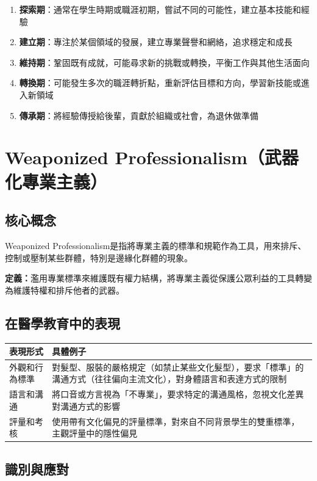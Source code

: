 \documentclass[12pt,a4paper]{article}
\begin{document}
\begin{enumerate}
    \item \textbf{探索期}：通常在學生時期或職涯初期，嘗試不同的可能性，建立基本技能和經驗
    \item \textbf{建立期}：專注於某個領域的發展，建立專業聲譽和網絡，追求穩定和成長
    \item \textbf{維持期}：鞏固既有成就，可能尋求新的挑戰或轉換，平衡工作與其他生活面向
    \item \textbf{轉換期}：可能發生多次的職涯轉折點，重新評估目標和方向，學習新技能或進入新領域
    \item \textbf{傳承期}：將經驗傳授給後輩，貢獻於組織或社會，為退休做準備
\end{enumerate}

\section{Weaponized Professionalism（武器化專業主義）}

\subsection{核心概念}

Weaponized Professionalism是指將專業主義的標準和規範作為工具，用來排斥、控制或壓制某些群體，特別是邊緣化群體的現象。

\textbf{定義：}濫用專業標準來維護既有權力結構，將專業主義從保護公眾利益的工具轉變為維護特權和排斥他者的武器。

\subsection{在醫學教育中的表現}

\begin{longtable}{p{4cm}p{10cm}}
\toprule
\textbf{表現形式} & \textbf{具體例子} \\
\midrule
\endhead
外觀和行為標準 & 對髮型、服裝的嚴格規定（如禁止某些文化髮型），要求「標準」的溝通方式（往往偏向主流文化），對身體語言和表達方式的限制 \\
語言和溝通 & 將口音或方言視為「不專業」，要求特定的溝通風格，忽視文化差異對溝通方式的影響 \\
評量和考核 & 使用帶有文化偏見的評量標準，對來自不同背景學生的雙重標準，主觀評量中的隱性偏見 \\
\bottomrule
\end{longtable}

\subsection{識別與應對}
\end{document}
